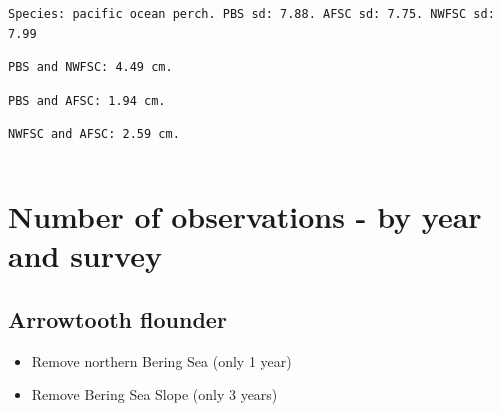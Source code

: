 \documentclass[
  letterpaper,
  DIV=11,
  numbers=noendperiod]{scrartcl}
\providecommand{\tightlist}{%
  \setlength{\itemsep}{0pt}\setlength{\parskip}{0pt}}\usepackage{longtable,booktabs,array}
\begin{document}
\begin{verbatim}
Species: pacific ocean perch. PBS sd: 7.88. AFSC sd: 7.75. NWFSC sd: 7.99
\end{verbatim}

\begin{verbatim}
PBS and NWFSC: 4.49 cm.
\end{verbatim}

\begin{verbatim}
PBS and AFSC: 1.94 cm.
\end{verbatim}

\begin{verbatim}
NWFSC and AFSC: 2.59 cm.
\end{verbatim}

\begin{verbatim}
\end{verbatim}

\section{Number of observations - by year and
survey}\label{number-of-observations---by-year-and-survey}

\subsection{Arrowtooth flounder}\label{arrowtooth-flounder}

\begin{itemize}
\tightlist
\item
  Remove northern Bering Sea (only 1 year)
\item
  Remove Bering Sea Slope (only 3 years)
\end{itemize}
\end{document}
